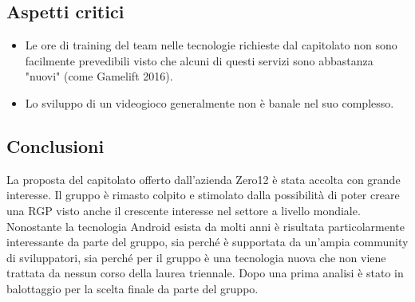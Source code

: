 \subsection{Aspetti critici}
\begin{itemize}
\item Le ore di training del team nelle tecnologie richieste dal capitolato non sono facilmente prevedibili visto che alcuni di questi servizi sono abbastanza "nuovi" (come Gamelift 2016).
\item Lo sviluppo di un videogioco generalmente non è banale nel suo complesso.
\end{itemize}
\subsection{Conclusioni}
La proposta del capitolato offerto dall'azienda Zero12 è stata accolta con grande interesse. Il gruppo è rimasto colpito e stimolato dalla possibilità 
di poter creare una RGP visto anche il crescente interesse nel settore a livello mondiale. Nonostante la tecnologia Android esista da molti anni è risultata particolarmente 
interessante da parte del gruppo, sia perché è supportata da un'ampia community di sviluppatori, sia perché per il gruppo è una tecnologia nuova che non viene 
trattata da nessun corso della laurea triennale. Dopo una prima analisi è stato in balottaggio per la scelta finale da parte del gruppo.


